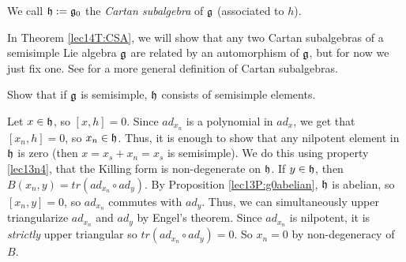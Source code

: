  \begin{definition}
    We call $\mathfrak{h}:=\mathfrak{g}_0$ the \emph{Cartan subalgebra} of $\mathfrak{g}$
    (associated to $h$).
 \end{definition}
 In Theorem \ref{lec14T:CSA}, we will show that any two Cartan subalgebras of a
 semisimple Lie algebra $\mathfrak{g}$ are related by an automorphism of $\mathfrak{g}$, but for now we
 just fix one. See \cite[\S 15]{Humphreys:LART} for a more general definition
 of Cartan subalgebras.

 \begin{exercise}\label{lec13Ex:hss}
   Show that if $\mathfrak{g}$ is semisimple, $\mathfrak{h}$ consists of semisimple elements.
   \begin{solution}
     Let $x\in \mathfrak{h}$, so $[x,h]=0$. Since $ad_{x_n}$ is a polynomial in $ad_x$, we get
     that $[x_n,h]=0$, so $x_n\in \mathfrak{h}$. Thus, it is enough to show that any nilpotent
     element in $\mathfrak{h}$ is zero (then $x=x_s+x_n=x_s$ is semisimple). We do this using
     property \ref{lec13n4}, that the Killing form is non-degenerate on $\mathfrak{h}$. If $y\in
     \mathfrak{h}$, then $B(x_n,y)=tr(ad_{x_n}\circ ad_y)$. By Proposition
     \ref{lec13P:g0abelian}, $\mathfrak{h}$ is abelian, so $[x_n,y]=0$, so $ad_{x_n}$ commutes
     with $ad_y$. Thus, we can simultaneously upper triangularize $ad_{x_n}$ and
     $ad_y$ by Engel's theorem. Since $ad_{x_n}$ is
     nilpotent, it is \emph{strictly} upper triangular so $tr(ad_{x_n}\circ ad_y)=0$.
     So $x_n=0$ by non-degeneracy of $B$.
   \end{solution}
 \end{exercise}

